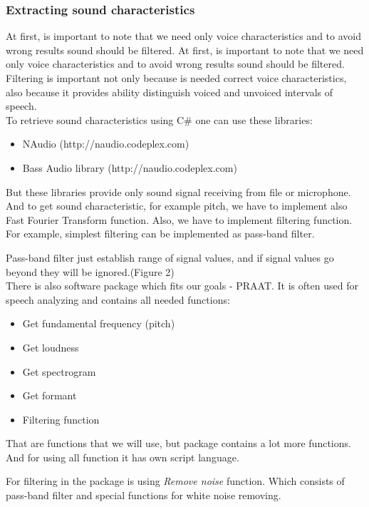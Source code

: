 \documentclass[12pt, letterpaper]{article}
\begin{document}
\subsubsection{Extracting sound characteristics}

At first, is important to note that we need only voice characteristics and to avoid wrong results sound should be filtered. At first, is important to note that we need only voice characteristics and to avoid wrong results sound should be filtered. Filtering is important not only because is needed correct voice characteristics, also because it provides ability distinguish voiced and unvoiced intervals of speech. 
\\

To retrieve sound characteristics using C\# one can use these libraries:
\begin{itemize}
	\item NAudio (http://naudio.codeplex.com)
	\item Bass Audio library (http://naudio.codeplex.com)
\end{itemize}

But these libraries provide only sound signal receiving from file or microphone. And to get sound characteristic, for example pitch, we have to implement also Fast Fourier Transform function. Also, we have to implement filtering function. For example, simplest filtering can be implemented as pass-band filter. 

Pass-band filter just establish range of signal values, and if signal values go beyond they will be ignored.(Figure 2)
\\
There is also software package which fits our goals - PRAAT. It is often used for speech analyzing and contains all needed functions:
\begin{itemize}
	\item Get fundamental frequency (pitch)
	\item Get loudness
	\item Get spectrogram
	\item Get formant
	\item Filtering function
\end{itemize}

That are functions that we will use, but package contains a lot more functions. And for using all function it has own script language. 

For filtering in the package is using \textit{Remove noise} function. Which consists of pass-band filter and special functions for white noise removing.
\end{document}
